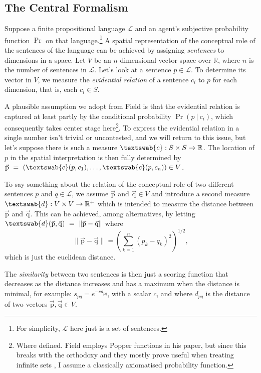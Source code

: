 \documentclass[11pt, a4paper]{scrartcl}
\renewcommand{\i}[1]{\emph{#1}}
\renewcommand{\L}{\mathcal{L}}
\renewcommand{\v}[1]{\vec{\mathrm{#1}}}
\newcommand{\m}[1]{\textswab{#1}}
\newcommand{\given}[1][]{\:#1\vert\:}
\begin{document}
\subsection{The Central Formalism}\label{sec:centralformalism}
Suppose a finite propositional language $\L$ and an agent's subjective probability function $\Pr$ on that language.\footnote{For simplicity, $\L$ here just is a set of sentences.} A spatial representation of the conceptual role of the sentences of the language can be achieved by assigning \i{sentences} to dimensions in a space. Let $V$ be an $n$-dimensional vector space over $\mathbb{R}$, where $n$ is the number of sentences in $\L$. Let's look at a sentence $p \in \L$. To determine its vector in $V$, we measure the \i{evidential relation} of a sentence $c_i$ to $p$ for each dimension, that is, each $c_i \in S$. 

A plausible assumption we adopt from Field is that the evidential relation is captured at least partly by the conditional probability $\Pr(p \given c_i)$, which consequently takes center stage here\footnote{Where defined. Field employs Popper functions in his paper, but since this breaks with the orthodoxy and they mostly prove useful when treating infinite sets \parencite[1352]{Leitgeb2013-LEIRBS}, I assume a classically axiomatised probability function.}. To express the evidential relation in a single number isn't trivial or uncontested, and we will return to this issue, but let's suppose there is such a measure $\m{c}: S \times S \rightarrow \mathbb{R}$. The location of $p$ in the spatial interpretation is then fully determined by $\v{p}~=~(\m{c}({p, c_1}),\dots, \m{c}(p, c_n)) \in V$.

To say something about the relation of the conceptual role of two different sentences $p$ and $q \in \L$, we assume $\v{p}$ and $\v{q} \in V$ and introduce a second measure $\m{d}: V \times V \rightarrow \mathbb{R}^+$ which is intended to measure the distance between $\v{p}$ and $\v{q}$. This can be achieved, among alternatives, by letting ${\m{d}(\v{p}, \v{q})~=~\lVert \v{p} - \v{q} \rVert}$ where 
\[
    \lVert \v{p}-\v{q} \rVert = {\left( \sum_{k=1}^n {(p_k-q_k)}^2 \right)}^{1/2}, 
\]
which is just the euclidean distance. 

The \i{similarity} between two sentences is then just a scoring function that decreases as the distance increases and has a maximum when the distance is minimal, for example: $s_{pq} = e^{-cd_{pq}}$, with a scalar $c$, and where $d_{pq}$ is the distance of two vectors $\v{p}, \v{q} \in V$. 
\end{document}
